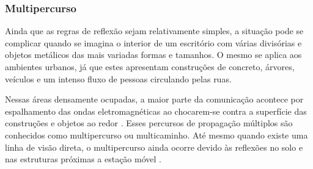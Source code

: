 \begin{figure}[H]
	\centering
\end{figure}

\subsubsection{Multipercurso}
\label{subsub:multipercurso}

Ainda que as regras de reflexão sejam relativamente simples, a situação pode se complicar quando se imagina o interior de um escritório com várias divisórias e objetos metálicos das mais variadas formas e tamanhos. O mesmo se aplica aos ambientes urbanos, já que estes apresentam construções de concreto, árvores, veículos e um intenso fluxo de pessoas circulando pelas ruas.

Nessas áreas densamente ocupadas, a maior parte da comunicação acontece por espalhamento das ondas eletromagnéticas ao chocarem-se contra a superfície das construções e objetos ao redor \cite{haykin2009}.  Esses percursos de propagação múltiplos são conhecidos como multipercurso ou multicaminho. Até mesmo quando existe uma linha de visão direta, o multipercurso ainda ocorre devido às reflexões no solo e nas estruturas próximas a estação móvel \cite{rappaport2009}.

\begin{figure}[H]
	\centering
\end{figure}

